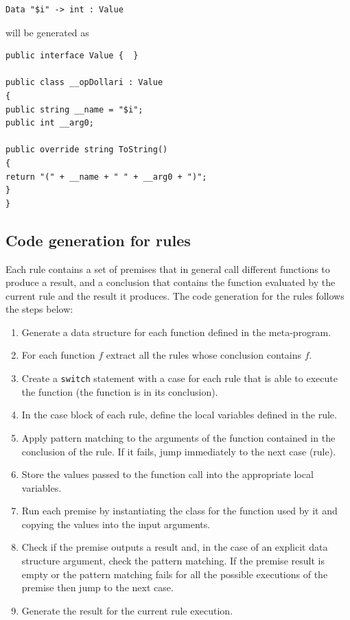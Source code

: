 \begin{lstlisting}
Data "$i" -> int : Value
\end{lstlisting}

\noindent
will be generated as

\begin{lstlisting}
public interface Value {  }

public class __opDollari : Value
{
public string __name = "$i";
public int __arg0;

public override string ToString()
{
return "(" + __name + " " + __arg0 + ")";
}
}
\end{lstlisting}

\subsection{Code generation for rules}
Each rule contains a set of premises that in general call different functions to produce a result, and a conclusion that contains the function evaluated by the current rule and the result it produces. The code generation for the rules follows the steps below:

\begin{enumerate}
	\item Generate a data structure for each function defined in the meta-program.
	\item For each function $f$ extract all the rules whose conclusion contains $f$.
	\item Create a \texttt{switch} statement with a case for each rule that is able to execute the function (the function is in its conclusion).
	\item In the case block of each rule, define the local variables defined in the rule.
	\item Apply pattern matching to the arguments of the function contained in the conclusion of the rule. If it fails, jump immediately to the next case (rule).
	\item Store the values passed to the function call into the appropriate local variables.
	\item Run each premise by instantiating the class for the function used by it and copying the values into the input arguments.
	\item Check if the premise outputs a result and, in the case of an explicit data structure argument, check the pattern matching. If the premise result is empty or the pattern matching fails for all the possible executions of the premise then jump to the next case.
	\item Generate the result for the current rule execution. 
\end{enumerate}

